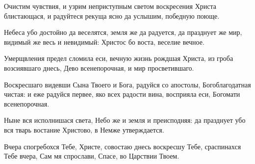 \label{_content_pesnopeniya-izsluzhb-triodi-cvetnoy}

\begin{mymulticols}




Очистим чувствия, и узрим неприступным светом воскресения Христа блистающася, и радуйтеся рекуща ясно да услышим, победную поюще. 


Небеса убо достойно да веселятся, земля же да радуется, да празднует же мир, видимый же весь и невидимый: Христос бо воста, веселие вечное. 



Умерщвления предел сломила еси, вечную жизнь рождшая Христа, из гроба возсиявшаго днесь, Дево всенепорочная, и мир просветившаго. 


Воскресшаго видевши Сына Твоего и Бога, радуйся со апостолы, Богоблагодатная чистая: и еже радуйся первее, яко всех радости вина, восприяла еси, Богомати всенепорочная. 




Ныне вся исполнишася света, Небо же и земля и преисподняя: да празднует убо вся тварь востание Христово, в Немже утверждается. 


Вчера спогребохся Тебе, Христе, совостаю днесь воскресшу Тебе, сраспинахся Тебе вчера, Сам мя спрослави, Спасе, во Царствии Твоем. 


\end{mymulticols}
